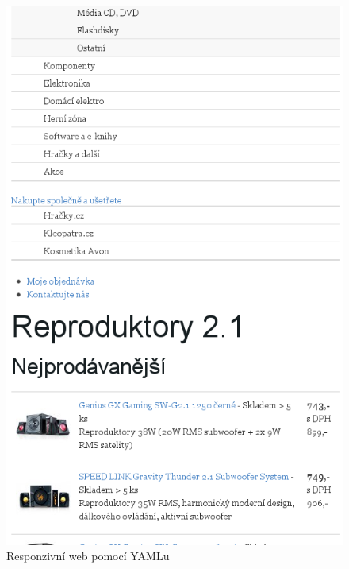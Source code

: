 \documentclass[thesis=B,czech]{FITthesis}[2012/06/26]
\begin{document}
\begin{figure}[h]
	\begin{center}
	\includegraphics[scale=0.7]{images/image16.png}
	\end{center}
	\caption{Responzivní web pomocí YAMLu}
	\label{imgYR}
\end{figure}
\end{document}
